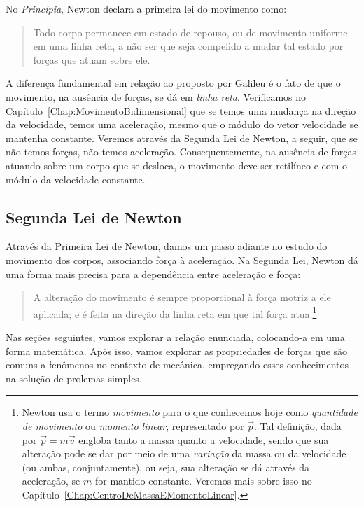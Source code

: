No \emph{Principia}, Newton declara a primeira lei do movimento como:
\begin{quote}
  Todo corpo permanece em estado de repouso, ou de movimento uniforme em uma linha reta, a não ser que seja compelido a mudar tal estado por forças que atuam sobre ele.
\end{quote}
%
A diferença fundamental em relação ao proposto por Galileu é o fato de que o movimento, na ausência de forças, se dá em \emph{linha reta}. Verificamos no Capítulo~\ref{Chap:MovimentoBidimensional} que se temos uma mudança na direção da velocidade, temos uma aceleração, mesmo que o módulo do vetor velocidade se mantenha constante. Veremos através da Segunda Lei de Newton, a seguir, que se não temos forças, não temos aceleração. Consequentemente, na ausência de forças atuando sobre um corpo que se desloca, o movimento deve ser retilíneo e com o módulo da velocidade constante.


\subsection{Segunda Lei de Newton}
\label{Sec:SegundaLeiDeNewton}

Através da Primeira Lei de Newton, damos um passo adiante no estudo do movimento dos corpos, associando força à aceleração. Na Segunda Lei, Newton dá uma forma mais precisa para a dependência entre aceleração e força:
\begin{quote}
  A alteração do movimento é sempre proporcional à força motriz a ele aplicada; e é feita na direção da linha reta em que tal força atua.\footnote{Newton usa o termo \emph{movimento} para o que conhecemos hoje como \emph{quantidade de movimento} ou \emph{momento linear}, representado por $\vec{p}$. Tal definição, dada por $\vec{p} = m\vec{v}$ engloba tanto a massa quanto a velocidade, sendo que sua alteração pode se dar por meio de uma \emph{variação} da massa ou da velocidade (ou ambas, conjuntamente), ou seja, sua alteração se dá através da aceleração, se $m$ for mantido constante. Veremos mais sobre isso no Capítulo~\ref{Chap:CentroDeMassaEMomentoLinear}.}
\end{quote}

Nas seções seguintes, vamos explorar a relação enunciada, colocando-a em uma forma matemática. Após isso, vamos explorar as propriedades de forças que são comuns a fenômenos no contexto de mecânica, empregando esses conhecimentos na solução de prolemas simples.
 
